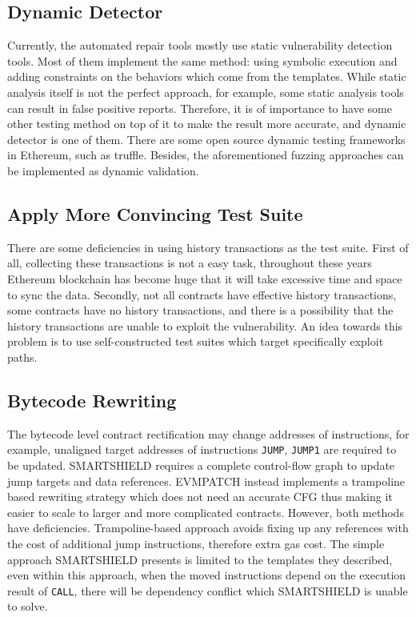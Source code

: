 \documentclass[sigplan,screen]{acmart}
\begin{document}
\subsection{Dynamic Detector}

Currently, the automated repair tools mostly use static vulnerability detection tools. Most of them implement the same method: using symbolic execution and adding constraints on the behaviors which come from the templates. While static analysis itself is not the perfect approach, for example, some static analysis tools can result in false positive reports. Therefore, it is of importance to have some other testing method on top of it to make the result more accurate, and dynamic detector is one of them. There are some open source dynamic testing frameworks in Ethereum, such as truffle\cite{truffle}. Besides, the aforementioned fuzzing approaches can be implemented as dynamic validation.

\subsection{Apply More Convincing Test Suite}

There are some deficiencies in using history transactions as the test suite. First of all, collecting these transactions is not a easy task, throughout these years Ethereum blockchain has become huge that it will take excessive time and space to sync the data. Secondly, not all contracts have effective history transactions, some contracts have no history transactions, and there is a possibility that the history transactions are unable to exploit the vulnerability. An idea towards this problem is to use self-constructed test suites which target specifically exploit paths.
\subsection{Bytecode Rewriting}

The bytecode level contract rectification may change addresses of instructions, for example, unaligned target addresses of instructions \texttt{JUMP}, \texttt{JUMP1} are required to be updated. SMARTSHIELD requires a complete  control-flow graph to update jump targets and data references. EVMPATCH instead implements a trampoline based rewriting strategy which does not need an accurate CFG thus making it easier to scale to larger and more complicated contracts. However, both methods have deficiencies. Trampoline-based approach avoids fixing up any references with the cost of additional jump instructions, therefore extra gas cost. The simple approach SMARTSHIELD presents is limited to the templates they described, even within this approach, when the moved instructions depend on the execution result of \texttt{CALL}, there will be dependency conflict which SMARTSHIELD is unable to solve.
\end{document}
